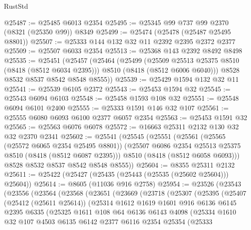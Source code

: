 \begin{lexlean}{RustStd}
\begin{coremodule}
@25487 := @25485 @6013 @2354
@25495 := @25345 @99 @737 @99 @2370 (@8321 (@25350 @99)) @8349
@25499 := @25474 (@25478 (@25487 @25495 @8801))
@25507 := @25333 @144 @132 @32 @11 @2392 @2395 @2372 @2377
@25509 := @25507 @6033 @2354
@25513 := @25368 @143 @2392 @8492 @8498
@25535 := @25451
    (@25457
      (@25464
        (@25499
          (@25509 @25513 @25375 @8510 (@8418 (@8512 @6034 @2395)))
          @8510
          (@8418 (@8512 @6006 @6040)))
        @8528
        @8532
        @8537
        @8542
        @8548
        @8555))
@25539 := @25429 @1594 @132 @32 @11
@25541 := @25539 @6105 @2372
@25543 := @25453 @1594 @32
@25545 := @25543 @6094 @6103
@25548 := @25458 @1593 @108 @32
@25551 := @25548 @6094 @6101 @2400
@25555 := @25333 @1591 @146 @32 @107
@25561 := @25555 @6080 @6093 @6100 @2377 @6057 @2354
@25563 := @25453 @1591 @32
@25565 := @25563 @6076 @6078
@25572 := @16663 @25311 @2132 @130 @32 @32 @2370 @2341
@25602 := @25541
    (@25545
      (@25551
        (@25561
          (@25565 (@25572 @6065 @2354 @25495 @8801))
          (@25507 @6086 @2354 @25513 @25375 @8510 (@8418 (@8512 @6087 @2395)))
          @8510
          (@8418 (@8512 @6058 @6093)))
        @8528
        @8532
        @8537
        @8542
        @8548
        @8555))
@25604 := @8355 @25311 @2132
@25611 := @25422 (@25427 (@25435 (@25443 (@25535 (@25602 @25604))) @25604))
@25614 := @8605 (@11036 @916 @2758)
@25954 := @23526
    (@23543
      (@23556
        (@23564
          (@23568
            (@23651
              (@23669
                (@23718
                  (@25307
                    (@25395
                      (@25407
                        (@25412 (@25611 @25614))
                        (@25314
                          @1612
                          @1619
                          @1601
                          @916
                          @6136
                          @6145
                          @2395
                          @6335
                          (@25325
                            @1611
                            @108
                            @64
                            @6136
                            @6143
                            @4098
                            (@25334
                              @1610
                              @32
                              @107
                              @4503
                              @6135
                              @6142
                              @2377
                              @6116
                              @2354
                              @25354
                              (@25333

\end{coremodule}
\end{lexlean}
